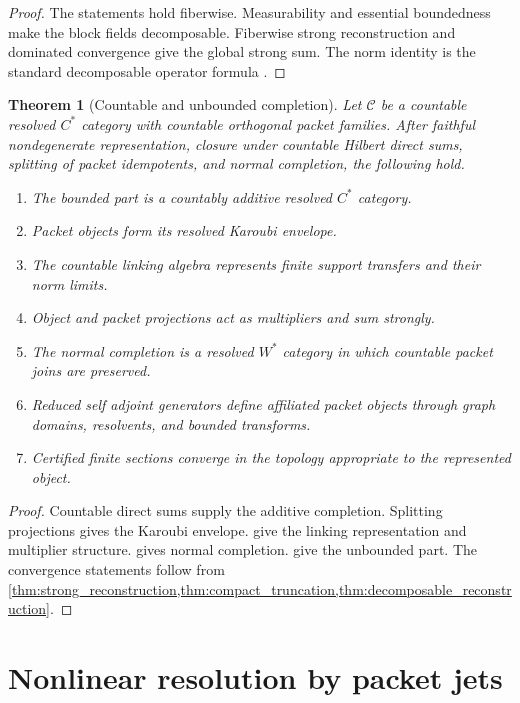 \documentclass{aomart}
\newtheorem{theorem}{Theorem}[section]
\theoremstyle{definition}
\theoremstyle{remark}
\newcommand{\Ccal}{\mathcal C}
\newcommand{\Rcite}[1]{\cite{#1}}
\begin{document}
\begin{proof}
The statements hold fiberwise. Measurability and essential boundedness make the block fields decomposable. Fiberwise strong reconstruction and dominated convergence give the global strong sum. The norm identity is the standard decomposable operator formula \Rcite{R8}.
\end{proof}

\begin{theorem}[Countable and unbounded completion]\label{thm:countable_completion}
Let \(\Ccal\) be a countable resolved \(C^*\) category with countable orthogonal packet families. After faithful nondegenerate representation, closure under countable Hilbert direct sums, splitting of packet idempotents, and normal completion, the following hold.
\begin{enumerate}
\item The bounded part is a countably additive resolved \(C^*\) category.
\item Packet objects form its resolved Karoubi envelope.
\item The countable linking algebra represents finite support transfers and their norm limits.
\item Object and packet projections act as multipliers and sum strongly.
\item The normal completion is a resolved \(W^*\) category in which countable packet joins are preserved.
\item Reduced self adjoint generators define affiliated packet objects through graph domains, resolvents, and bounded transforms.
\item Certified finite sections converge in the topology appropriate to the represented object.
\end{enumerate}
\end{theorem}

\begin{proof}
Countable direct sums supply the additive completion. Splitting projections gives the Karoubi envelope.  give the linking representation and multiplier structure.  gives normal completion.  give the unbounded part. The convergence statements follow from \cref{thm:strong_reconstruction,thm:compact_truncation,thm:decomposable_reconstruction}.
\end{proof}

\section{Nonlinear resolution by packet jets}\label{sec:nonlinear}
\end{document}
